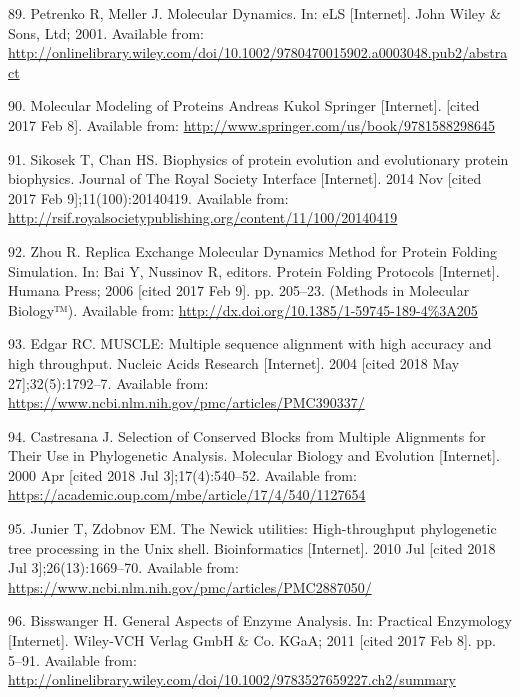 \documentclass[12pt,twoside]{reedthesis}
\begin{document}
  \hypertarget{ref-petrenko_molecular_2001}{}
  89. Petrenko R, Meller J. Molecular Dynamics. In: eLS {[}Internet{]}.
  John Wiley \& Sons, Ltd; 2001. Available from:
  \url{http://onlinelibrary.wiley.com/doi/10.1002/9780470015902.a0003048.pub2/abstract}
  
  \hypertarget{ref-kukol_molecular_2008}{}
  90. Molecular Modeling of Proteins Andreas Kukol Springer
  {[}Internet{]}. {[}cited 2017 Feb 8{]}. Available from:
  \url{http://www.springer.com/us/book/9781588298645}
  
  \hypertarget{ref-sikosek_biophysics_2014}{}
  91. Sikosek T, Chan HS. Biophysics of protein evolution and evolutionary
  protein biophysics. Journal of The Royal Society Interface
  {[}Internet{]}. 2014 Nov {[}cited 2017 Feb 9{]};11(100):20140419.
  Available from:
  \url{http://rsif.royalsocietypublishing.org/content/11/100/20140419}
  
  \hypertarget{ref-bai_replica_2006}{}
  92. Zhou R. Replica Exchange Molecular Dynamics Method for Protein
  Folding Simulation. In: Bai Y, Nussinov R, editors. Protein Folding
  Protocols {[}Internet{]}. Humana Press; 2006 {[}cited 2017 Feb 9{]}. pp.
  205--23. (Methods in Molecular Biology™). Available from:
  \url{http://dx.doi.org/10.1385/1-59745-189-4\%3A205}
  
  \hypertarget{ref-edgar_muscle_2004}{}
  93. Edgar RC. MUSCLE: Multiple sequence alignment with high accuracy and
  high throughput. Nucleic Acids Research {[}Internet{]}. 2004 {[}cited
  2018 May 27{]};32(5):1792--7. Available from:
  \url{https://www.ncbi.nlm.nih.gov/pmc/articles/PMC390337/}
  
  \hypertarget{ref-castresana_selection_2000}{}
  94. Castresana J. Selection of Conserved Blocks from Multiple Alignments
  for Their Use in Phylogenetic Analysis. Molecular Biology and Evolution
  {[}Internet{]}. 2000 Apr {[}cited 2018 Jul 3{]};17(4):540--52. Available
  from: \url{https://academic.oup.com/mbe/article/17/4/540/1127654}
  
  \hypertarget{ref-junier_newick_2010}{}
  95. Junier T, Zdobnov EM. The Newick utilities: High-throughput
  phylogenetic tree processing in the Unix shell. Bioinformatics
  {[}Internet{]}. 2010 Jul {[}cited 2018 Jul 3{]};26(13):1669--70.
  Available from:
  \url{https://www.ncbi.nlm.nih.gov/pmc/articles/PMC2887050/}
  
  \hypertarget{ref-bisswanger_general_2011}{}
  96. Bisswanger H. General Aspects of Enzyme Analysis. In: Practical
  Enzymology {[}Internet{]}. Wiley-VCH Verlag GmbH \& Co. KGaA; 2011
  {[}cited 2017 Feb 8{]}. pp. 5--91. Available from:
  \url{http://onlinelibrary.wiley.com/doi/10.1002/9783527659227.ch2/summary}
  
\end{document}
